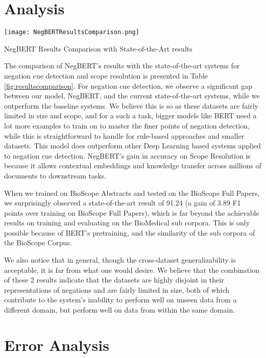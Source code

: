 \documentclass[10pt, a4paper]{article}
\begin{document}
\section{Analysis}

\begin{table}[h]
    \centering
    \texttt{[image: NegBERTResultsComparison.png]}
    \caption{NegBERT Results Comparison with State-of-the-Art results}
    \label{fig:resultscomparison}
\end{table}

The comparison of NegBERT's results with the state-of-the-art systems for negation cue detection and scope resolution is presented in Table \ref{fig:resultscomparison}. For negation cue detection, we observe a significant gap between our model, NegBERT, and the current state-of-the-art systems, while we outperform the baseline systems. We believe this is so as these datasets are fairly limited in size and scope, and for a such a task, bigger models like BERT need a lot more examples to train on to master the finer points of negation detection, while this is straightforward to handle for rule-based approaches and smaller datasets. This model does outperform other Deep Learning based systems applied to negation cue detection.
NegBERT’s gain in accuracy on Scope Resolution is because it allows contextual embeddings and knowledge transfer across millions of documents to downstream tasks.
\par When we trained on BioScope Abstracts and tested on the BioScope Full Papers, we surprisingly observed a state-of-the-art result of 91.24 (a gain of 3.89 F1 points over training on BioScope Full Papers), which is far beyond the achievable results on training and evaluating on the BioMedical sub corpora. This is only possible because of BERT’s pretraining, and the similarity of the sub corpora of the BioScope Corpus. 
\par We also notice that in general, though the cross-dataset generalizability is acceptable, it is far from what one would desire. We believe that  the combination of these 2 results  indicate that the datasets are highly disjoint in their representations of negations and are fairly limited in size, both of which contribute to the system’s inability to perform well on unseen data from a different domain, but perform well on data from within the same domain.

\section{Error Analysis}
\end{document}
